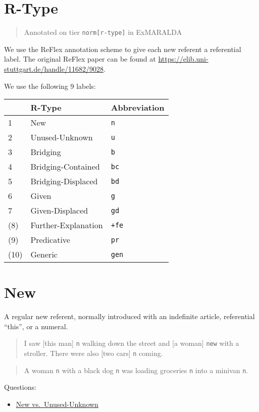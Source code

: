 \documentclass[
]{book}
\providecommand{\tightlist}{%
  \setlength{\itemsep}{0pt}\setlength{\parskip}{0pt}}
\begin{document}
\hypertarget{r-type}{%
\section{R-Type}\label{r-type}}

\begin{quote}
Annotated on tier \texttt{norm{[}r-type{]}} in ExMARALDA
\end{quote}

We use the ReFlex annotation scheme to give each new referent a referential label.
The original ReFlex paper can be found at \url{https://elib.uni-stuttgart.de/handle/11682/9028}.

We use the following 9 labels:

\begin{longtable}[]{@{}lll@{}}
\toprule
& R-Type & Abbreviation\tabularnewline
\midrule
\endhead
1 & New & \texttt{n}\tabularnewline
2 & Unused-Unknown & \texttt{u}\tabularnewline
3 & Bridging & \texttt{b}\tabularnewline
4 & Bridging-Contained & \texttt{bc}\tabularnewline
5 & Bridging-Displaced & \texttt{bd}\tabularnewline
6 & Given & \texttt{g}\tabularnewline
7 & Given-Displaced & \texttt{gd}\tabularnewline
(8) & Further-Explanation & \texttt{+fe}\tabularnewline
(9) & Predicative & \texttt{pr}\tabularnewline
(10) & Generic & \texttt{gen}\tabularnewline
\bottomrule
\end{longtable}

\hypertarget{new}{%
\section{New}\label{new}}

A regular new referent, normally introduced with an indefinite article, referential ``this'', or a numeral.

\begin{quote}
I saw {[}this man{]} \texttt{n} walking down the street and {[}a woman{]} \texttt{new} with a stroller.
There were also {[}two cars{]} \texttt{n} coming.
\end{quote}

\begin{quote}
A woman \texttt{n} with a black dog \texttt{n} was loading groceries \texttt{n} into a minivan \texttt{n}.
\end{quote}

Questions:

\begin{itemize}
\tightlist
\item
  \protect\hyperlink{new-vs.-unused-unknown}{New vs.~Unused-Unknown}
\end{itemize}
\end{document}
